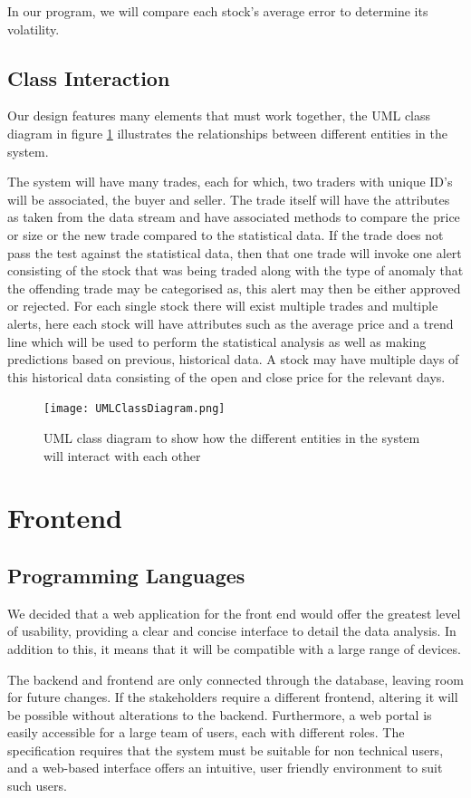 \documentclass[11pt, oneside, a4paper]{article}
\begin{document}
In our program, we will compare each stock’s average error to determine its volatility.

\subsection{Class Interaction}
Our design features many elements that must work together, the UML class diagram
in figure \ref{ClassDiagram} illustrates the relationships between different
entities in the system.

The system will have many trades, each for which, two traders with unique ID's
will be associated, the buyer and seller. The trade itself will have the attributes
as taken from the data stream and have associated methods to compare the price or
size or the new trade compared to the statistical data. If the trade does not pass
the test against the statistical data, then that one trade will invoke one alert
consisting of the stock that was being traded along with the type of anomaly that
the offending trade may be categorised as, this alert may then be either approved
or rejected. For each single stock there will exist multiple trades and multiple
alerts, here each stock will have attributes such as the average price and a
trend line which will be used to perform the statistical analysis as well as making
predictions based on previous, historical data. A stock may have multiple days of
this historical data consisting of the open and close price for the relevant days.

\begin{figure}[h]
	\centering
		\texttt{[image: UMLClassDiagram.png]}
	\caption{UML class diagram to show how the different entities in the system will interact with each other}
	\label{ClassDiagram}
\end{figure}

\section{Frontend}
\subsection{Programming Languages}
We decided that a web application for the front end would offer the greatest level
of usability, providing a clear and concise interface to detail the data analysis.
In addition to this, it means that it will be compatible with a large range of
devices.

The backend and frontend are only connected through the database, leaving room for
future changes. If the stakeholders require a different frontend, altering it will
be possible without alterations to the backend. Furthermore, a web portal is easily
accessible for a large team of users, each with different roles. The specification
requires that the system must be suitable for non technical users, and a web-based
interface offers an intuitive, user friendly environment to suit such users.
\end{document}
